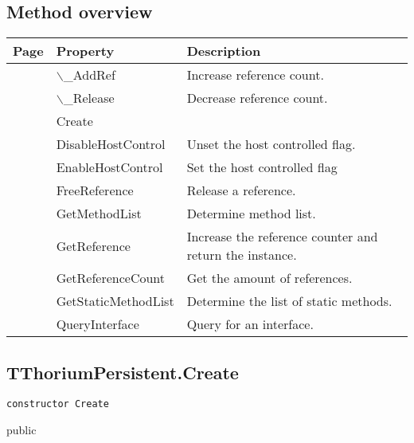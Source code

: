 \subsection{Method overview}
\label{thoriumcorepkg:thorium:tthoriumpersistent:methods}
\begin{tabularx}{\textwidth}{llX}
Page & Property & Description  \\ \hline
\pageref{thoriumcorepkg:thorium:tthoriumpersistent:addref} & $\backslash$\_AddRef  & Increase reference count. \\
\pageref{thoriumcorepkg:thorium:tthoriumpersistent:release} & $\backslash$\_Release  & Decrease reference count. \\
\pageref{thoriumcorepkg:thorium:tthoriumpersistent:create} & Create  &  \\
\pageref{thoriumcorepkg:thorium:tthoriumpersistent:disablehostcontrol} & DisableHostControl  & Unset the host controlled flag. \\
\pageref{thoriumcorepkg:thorium:tthoriumpersistent:enablehostcontrol} & EnableHostControl  & Set the host controlled flag \\
\pageref{thoriumcorepkg:thorium:tthoriumpersistent:freereference} & FreeReference  & Release a reference. \\
\pageref{thoriumcorepkg:thorium:tthoriumpersistent:getmethodlist} & GetMethodList  & Determine method list. \\
\pageref{thoriumcorepkg:thorium:tthoriumpersistent:getreference} & GetReference  & Increase the reference counter and return the instance. \\
\pageref{thoriumcorepkg:thorium:tthoriumpersistent:getreferencecount} & GetReferenceCount  & Get the amount of references. \\
\pageref{thoriumcorepkg:thorium:tthoriumpersistent:getstaticmethodlist} & GetStaticMethodList  & Determine the list of static methods. \\
\pageref{thoriumcorepkg:thorium:tthoriumpersistent:queryinterface} & QueryInterface  & Query for an interface. \\
\hline
\end{tabularx}
\subsection{TThoriumPersistent.Create}
\label{thoriumcorepkg:thorium:tthoriumpersistent:create}
\begin{FPCList}
\Declaration 

\begin{verbatim}
constructor Create
\end{verbatim}
\Visibility
public
\end{FPCList}
